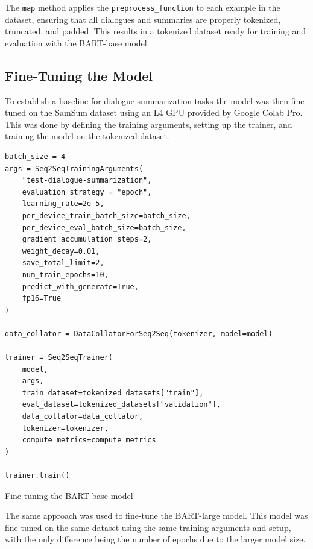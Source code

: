 The \texttt{map} method applies the \texttt{preprocess\_function} to each example in the dataset, ensuring that all dialogues and summaries are properly tokenized, truncated, and padded. This results in a tokenized dataset ready for training and evaluation with the BART-base model.

    \subsection{Fine-Tuning the Model}
        To establish a baseline for dialogue summarization tasks the model was then fine-tuned on the SamSum dataset using an L4 GPU provided by Google Colab Pro.
        This was done by defining the training arguments, setting up the trainer, and training the model on the tokenized dataset.
        \begin{listing}[H]
\begin{verbatim}
batch_size = 4
args = Seq2SeqTrainingArguments(
    "test-dialogue-summarization",
    evaluation_strategy = "epoch",
    learning_rate=2e-5,
    per_device_train_batch_size=batch_size,
    per_device_eval_batch_size=batch_size,
    gradient_accumulation_steps=2,
    weight_decay=0.01,
    save_total_limit=2,
    num_train_epochs=10,
    predict_with_generate=True,
    fp16=True
)

data_collator = DataCollatorForSeq2Seq(tokenizer, model=model)

trainer = Seq2SeqTrainer(
    model,
    args,
    train_dataset=tokenized_datasets["train"],
    eval_dataset=tokenized_datasets["validation"],
    data_collator=data_collator,
    tokenizer=tokenizer,
    compute_metrics=compute_metrics
)

trainer.train()
            \end{verbatim}
            \caption{Fine-tuning the BART-base model}
            \label{listing:Fine-tuning_BART}
        \end{listing}
        The same approach was used to fine-tune the BART-large model. This model was fine-tuned on the same dataset using the same training arguments and setup, with the only difference being the number of epochs due to the larger model size.


